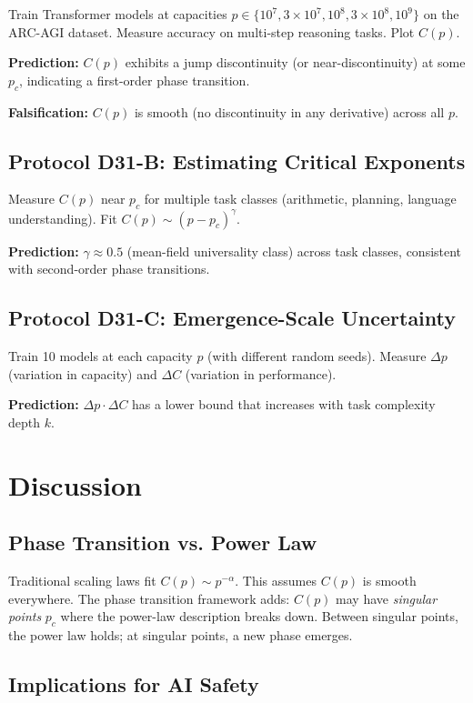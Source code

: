 \documentclass[12pt]{article}
\theoremstyle{definition}
\theoremstyle{remark}
\begin{document}
Train Transformer models at capacities $p \in \{10^7, 3\times 10^7, 10^8, 3\times 10^8, 10^9\}$ on the ARC-AGI dataset. Measure accuracy on multi-step reasoning tasks. Plot $C(p)$.

\textbf{Prediction:} $C(p)$ exhibits a jump discontinuity (or near-discontinuity) at some $p_c$, indicating a first-order phase transition.

\textbf{Falsification:} $C(p)$ is smooth (no discontinuity in any derivative) across all $p$.

\subsection{Protocol D31-B: Estimating Critical Exponents}

Measure $C(p)$ near $p_c$ for multiple task classes (arithmetic, planning, language understanding). Fit $C(p) \sim (p - p_c)^\gamma$.

\textbf{Prediction:} $\gamma \approx 0.5$ (mean-field universality class) across task classes, consistent with second-order phase transitions.

\subsection{Protocol D31-C: Emergence-Scale Uncertainty}

Train 10 models at each capacity $p$ (with different random seeds). Measure $\Delta p$ (variation in capacity) and $\Delta C$ (variation in performance).

\textbf{Prediction:} $\Delta p \cdot \Delta C$ has a lower bound that increases with task complexity depth $k$.

\section{Discussion}

\subsection{Phase Transition vs. Power Law}

Traditional scaling laws fit $C(p) \sim p^{-\alpha}$. This assumes $C(p)$ is smooth everywhere. The phase transition framework adds: $C(p)$ may have \emph{singular points} $p_c$ where the power-law description breaks down. Between singular points, the power law holds; at singular points, a new phase emerges.

\subsection{Implications for AI Safety}
\end{document}
